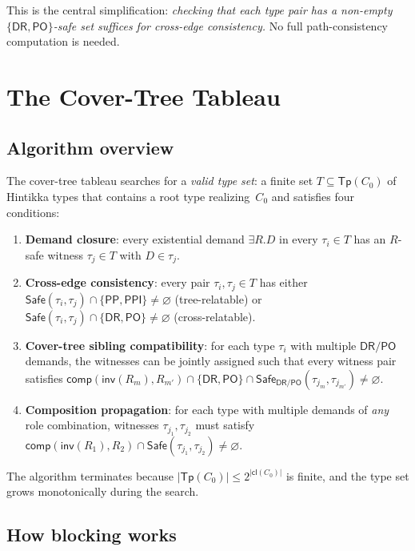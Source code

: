 \documentclass[
]{ceurart}
\theoremstyle{definition}
\newcommand{\DR}{\ensuremath{\mathsf{DR}}}
\newcommand{\PO}{\ensuremath{\mathsf{PO}}}
\newcommand{\PP}{\ensuremath{\mathsf{PP}}}
\newcommand{\PPI}{\ensuremath{\mathsf{PPI}}}
\newcommand{\inv}{\ensuremath{\mathsf{inv}}}
\newcommand{\comp}{\ensuremath{\mathsf{comp}}}
\newcommand{\cl}{\ensuremath{\mathsf{cl}}}
\newcommand{\Tp}{\ensuremath{\mathsf{Tp}}}
\newcommand{\Safe}{\ensuremath{\mathsf{Safe}}}
\begin{document}
This is the central simplification: \emph{checking that each type
pair has a non-empty $\{\DR,\PO\}$-safe set suffices for
cross-edge consistency.}  No full path-consistency computation is
needed.

\section{The Cover-Tree Tableau}
\label{sec:cover-tree}

\subsection{Algorithm overview}

The cover-tree tableau searches for a \emph{valid type set}:
a finite set $T \subseteq \Tp(C_0)$ of Hintikka types that
contains a root type realizing~$C_0$ and satisfies four conditions:

\begin{enumerate}[label=(CT\arabic*)]
  \item \textbf{Demand closure}: every existential demand
    $\exists R.D$ in every $\tau_i \in T$ has an $R$-safe
    witness $\tau_j \in T$ with $D \in \tau_j$.
  \item \textbf{Cross-edge consistency}: every pair
    $\tau_i, \tau_j \in T$ has either $\Safe(\tau_i,\tau_j)
    \cap \{\PP,\PPI\} \neq \varnothing$ (tree-relatable) or
    $\Safe(\tau_i,\tau_j) \cap \{\DR,\PO\} \neq \varnothing$
    (cross-relatable).
  \item \textbf{Cover-tree sibling compatibility}: for each
    type $\tau_i$ with multiple $\DR/\PO$ demands, the witnesses
    can be jointly assigned such that every witness pair satisfies
    $\comp(\inv(R_m), R_{m'}) \cap \{\DR,\PO\} \cap
    \Safe_{\DR/\PO}(\tau_{j_m}, \tau_{j_{m'}}) \neq \varnothing$.
  \item \textbf{Composition propagation}: for each type with
    multiple demands of \emph{any} role combination, witnesses
    $\tau_{j_1}, \tau_{j_2}$ must satisfy
    $\comp(\inv(R_1), R_2) \cap \Safe(\tau_{j_1}, \tau_{j_2})
    \neq \varnothing$.
\end{enumerate}

The algorithm terminates because $|\Tp(C_0)| \leq 2^{|\cl(C_0)|}$
is finite, and the type set grows monotonically during the search.

\subsection{How blocking works}
\end{document}
